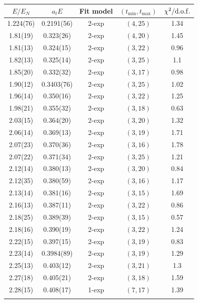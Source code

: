 \begin{table}
    \centering
    \begin{tabu}{c|c|c|c|c}
        $E / E_N$ & $a_t E$ & Fit model & $(t_{\mathrm{min}}, {t_\mathrm{max}})$ & $\chi^2 / \rm{d.o.f.}$\\
        \hline
        \rowfont{\color{red}}
        1.224(76)&0.2191(56)&2{-}exp&$(4, 25)$&1.34 \\
        1.81(19)&0.323(26)&2{-}exp&$(4, 20)$&1.45 \\
        1.81(13)&0.324(15)&2{-}exp&$(3, 22)$&0.96 \\
        1.82(13)&0.325(14)&2{-}exp&$(3, 25)$&1.1 \\
        1.85(20)&0.332(32)&2{-}exp&$(3, 17)$&0.98 \\
        1.90(12)&0.3403(76)&2{-}exp&$(3, 25)$&1.02 \\
        1.96(14)&0.350(16)&2{-}exp&$(3, 22)$&1.25 \\
        1.98(21)&0.355(32)&2{-}exp&$(3, 18)$&0.63 \\
        2.03(15)&0.364(20)&2{-}exp&$(3, 20)$&1.32 \\
        2.06(14)&0.369(13)&2{-}exp&$(3, 19)$&1.71 \\
        2.07(23)&0.370(36)&2{-}exp&$(3, 16)$&1.78 \\
        2.07(22)&0.371(34)&2{-}exp&$(3, 25)$&1.21 \\
        2.12(14)&0.380(13)&2{-}exp&$(3, 20)$&0.84 \\
        \rowfont{\color{red}}
        2.12(35)&0.380(59)&2{-}exp&$(3, 16)$&1.17 \\
        2.13(14)&0.381(16)&2{-}exp&$(3, 15)$&1.69 \\
        2.16(13)&0.387(11)&2{-}exp&$(3, 22)$&0.86 \\
        \rowfont{\color{red}}
        2.18(25)&0.389(39)&2{-}exp&$(3, 15)$&0.57 \\
        \rowfont{\color{red}}
        2.18(16)&0.390(19)&2{-}exp&$(3, 22)$&1.24 \\
        \rowfont{\color{red}}
        2.22(15)&0.397(15)&2{-}exp&$(3, 19)$&0.83 \\
        2.23(14)&0.3984(89)&2{-}exp&$(3, 19)$&1.29 \\
        2.25(13)&0.403(12)&2{-}exp&$(3, 21)$&1.3 \\
        2.27(18)&0.405(21)&2{-}exp&$(3, 18)$&1.59 \\
        2.28(15)&0.408(17)&1{-}exp&$(7, 17)$&1.39 \\
        \rowfont{\color{red}}

\end{tabu}
\end{table}
